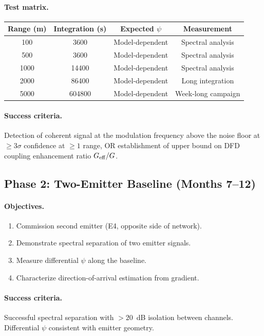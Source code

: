 \documentclass[11pt,a4paper]{article}
\begin{document}
\paragraph{Test matrix.}
\begin{center}
\begin{tabular}{cccc}
\toprule
\textbf{Range (m)} & \textbf{Integration (s)} & \textbf{Expected $\psi$} & \textbf{Measurement} \\
\midrule
100 & 3600 & Model-dependent & Spectral analysis \\
500 & 3600 & Model-dependent & Spectral analysis \\
1000 & 14400 & Model-dependent & Spectral analysis \\
2000 & 86400 & Model-dependent & Long integration \\
5000 & 604800 & Model-dependent & Week-long campaign \\
\bottomrule
\end{tabular}
\end{center}

\paragraph{Success criteria.}
Detection of coherent signal at the modulation frequency above the noise
floor at $\geq 3\sigma$ confidence at $\geq 1$ range, OR establishment
of upper bound on DFD coupling enhancement ratio $G_{\rm eff}/G$.

\subsection{Phase 2: Two-Emitter Baseline (Months 7--12)}

\paragraph{Objectives.}
\begin{enumerate}
\item Commission second emitter (E4, opposite side of network).
\item Demonstrate spectral separation of two emitter signals.
\item Measure differential $\psi$ along the baseline.
\item Characterize direction-of-arrival estimation from gradient.
\end{enumerate}

\paragraph{Success criteria.}
Successful spectral separation with $> 20$~dB isolation between
channels. Differential $\psi$ consistent with emitter geometry.
\end{document}
